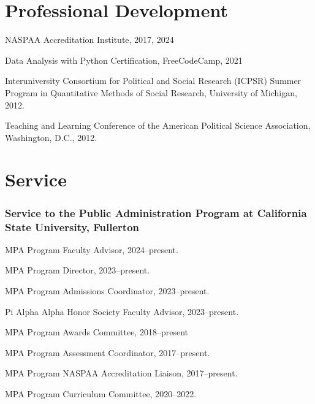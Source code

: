 \documentclass[12pt,letterpaper]{article}
\renewenvironment{itemize}{
  \begin{list}{}{
    \setlength{\leftmargin}{1.5em}
    \setlength{\itemsep}{0.25em}
    \setlength{\parskip}{0pt}
    \setlength{\parsep}{0.25em}
  }
}{
  \end{list}
}
\begin{document}
\section*{Professional Development}
\begin{itemize}\leftmargin=2pt\itemindent=-15pt\leftmargin=2pt\itemindent=-15pt
    \item NASPAA Accreditation Institute, 2017, 2024
    \item Data Analysis with Python Certification, FreeCodeCamp, 2021
    \item Interuniversity Consortium for Political and Social Research (ICPSR) Summer Program in Quantitative Methods of Social Research, University of Michigan, 2012. 
    \item Teaching and Learning Conference of the American Political Science Association, Washington, D.C., 2012.
\end{itemize}

\section*{Service}

\subsubsection*{Service to the Public Administration Program at California State University, Fullerton}

\begin{itemize}\leftmargin=2pt\itemindent=-15pt\leftmargin=2pt\itemindent=-15pt
    \item MPA Program Faculty Advisor, 2024--present.
    \item MPA Program Director, 2023--present.
    \item MPA Program Admissions Coordinator, 2023--present.
    \item Pi Alpha Alpha Honor Society Faculty Advisor, 2023--present.
    \item MPA Program Awards Committee, 2018--present
    \item MPA Program Assessment Coordinator, 2017--present.
    \item MPA Program NASPAA Accreditation Liaison, 2017--present.
    \item MPA Program Curriculum Committee, 2020--2022.
\end{itemize}
\end{document}
